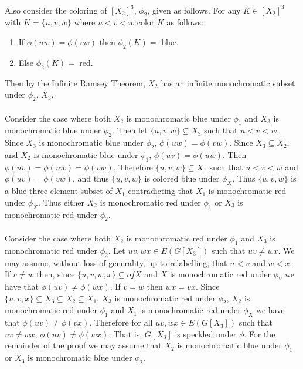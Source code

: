 \documentclass[letterpaper,12pt,oneside,onecolumn]{article}
\begin{document}
\paragraph{}
Also consider the coloring of $[X_2]^3$, $\phi_2$, given as follows. For any $K \in [X_2]^3$ with $K = \{u,v,w\}$ where $u<v<w$ color $K$ as follows:
\begin{enumerate}
\item If $\phi(uw) = \phi(vw)$ then $\phi_2(K)=$ blue.
\item Else $\phi_2(K)=$ red.
\end{enumerate}
Then by the Infinite Ramsey Theorem, $X_2$ has an infinite monochromatic subset under $\phi_2$, $X_3$.
\paragraph{}
Consider the case where both $X_2$ is monochromatic blue under $\phi_1$ and $X_3$ is monochromatic blue under $\phi_2$. Then let $\{u,v,w\} \subseteq X_3$ such that $u<v<w$. Since $X_3$ is monochromatic blue under $\phi_2$, $\phi(uw) = \phi(vw)$. Since $X_3 \subseteq X_2$, and $X_2$ is monochromatic blue under $\phi_1$, $\phi(uv) = \phi(uw)$. Then $\phi(uv) = \phi(uw) = \phi(vw)$. Therefore $\{u,v,w\} \subseteq X_1$ such that $u<v<w$ and $\phi(uv) = \phi(vw)$, and thus $\{u,v,w\}$ is colored blue under $\phi_X$. Thus $\{u,v,w\}$ is a blue three element subset of $X_1$ contradicting that $X_1$ is monochromatic red under $\phi_X$. Thus either $X_2$ is monochromatic red under $\phi_1$ or $X_3$ is monochromatic red under $\phi_2$.
\paragraph{}
Consider the case where both $X_2$ is monochromatic red under $\phi_1$ and $X_3$ is monochromatic red under $\phi_2$. Let $uv,wx \in E(G[X_3])$ such that $uv \neq wx$. We may assume, without loss of generality, up to relabelling, that $u<v$ and $w<x$. If $v \neq w$ then, since $\{u,v,w,x\} \subseteq of X$ and $X$ is monochromatic red under $\phi_V$ we have that $\phi(uv) \neq \phi(wx)$. If $v=w$ then $wx = vx$. Since $\{u,v,x\} \subseteq X_3 \subseteq X_2 \subseteq X_1$, $X_3$ is monochromatic red under $\phi_2$, $X_2$ is monochromatic red under $\phi_1$ and $X_1$ is monochromatic red under $\phi_X$ we have that $\phi(uv) \neq \phi(vx)$. Therefore for all $uv, wx \in E(G[X_3])$ such that $uv \neq wx$, $\phi(uv) \neq \phi(wx)$. That is, $G[X_3]$ is speckled under $\phi$. For the remainder of the proof we may assume that $X_2$ is monochromatic blue under $\phi_1$ or $X_3$ is monochromatic blue under $\phi_2$.
\end{document}
